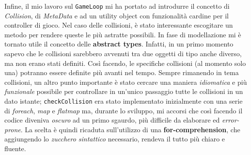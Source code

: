 

 Infine, il mio lavoro sul \texttt{GameLoop} mi ha portato ad introdurre il concetto di \textit{Collision}, di \textit{MetaData} e ad un utility object con funzionalità cardine per il controller di gioco. Nel caso delle collisioni, è stato interessante escogitare un metodo per rendere queste le più astratte possibili. In fase di modellazione mi è tornato utile il concetto delle \textbf{abstract types}. Infatti, in un primo momento sapevo che le collisioni sarebbero avvenuti tra due oggetti di tipo anche diverso, ma non erano stati definiti. Così facendo, le specifiche collisioni (al momento solo una) potranno essere definite più avanti nel tempo. Sempre rimanendo in tema collisioni, un altro punto importante è stato cercare una maniera \textit{idiomatica} e più \textit{funzionale} possibile per controllare in un'unico passaggio tutte le collisioni in un dato istante; \texttt{checkCollision} era stato implementato inizialmente con una serie di \textit{foreach}, \textit{map} e \textit{flatmap} ma, durante lo sviluppo, mi accorsi che così facendo il codice diveniva \textit{oscuro} ad un primo sgaurdo, più difficile da elaborare ed \textit{error-prone}. La scelta è quindi ricaduta sull'utilizzo di una \textbf{for-comprehension}, che aggiungendo lo \textit{zucchero sintattico} necessario, rendeva il tutto più chiaro e fluente.

 

